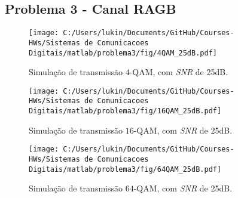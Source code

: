 \subsection{Problema 3 - Canal RAGB}

\begin{figure}[!ht]
    \centering
    \texttt{[image: C:/Users/lukin/Documents/GitHub/Courses-HWs/Sistemas de Comunicacoes Digitais/matlab/problema3/fig/4QAM\_25dB.pdf]}
    \caption{Simulação de transmissão $4$-QAM, com \textit{SNR} de 25dB.}
    \label{fig:4QAM_25dB}
\end{figure}


\begin{figure}[!ht]
    \centering
    \texttt{[image: C:/Users/lukin/Documents/GitHub/Courses-HWs/Sistemas de Comunicacoes Digitais/matlab/problema3/fig/16QAM\_25dB.pdf]}
    \caption{Simulação de transmissão $16$-QAM, com \textit{SNR} de 25dB.}
    \label{fig:16QAM_25dB}
\end{figure}


\begin{figure}[!ht]
    \centering
    \texttt{[image: C:/Users/lukin/Documents/GitHub/Courses-HWs/Sistemas de Comunicacoes Digitais/matlab/problema3/fig/64QAM\_25dB.pdf]}
    \caption{Simulação de transmissão $64$-QAM, com \textit{SNR} de 25dB.}
    \label{fig:64QAM_25dB}
\end{figure}